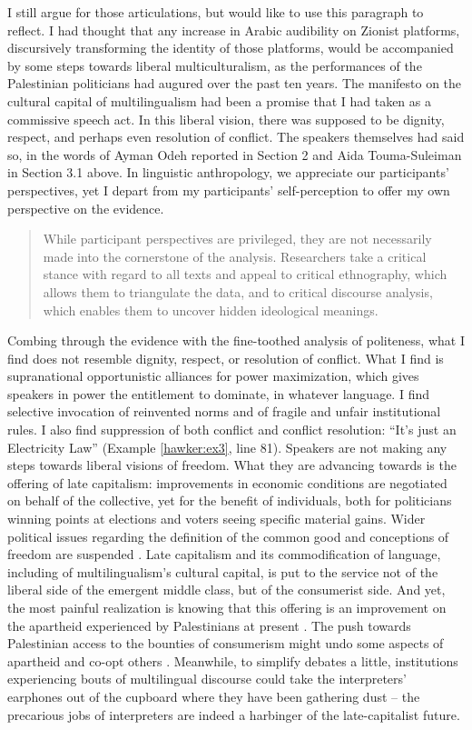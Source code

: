 \documentclass[output=paper,arabicfont]{langscibook}
\begin{document}
I still argue for those articulations, but would like to use this paragraph to reflect. I had thought that any increase in Arabic audibility on Zionist platforms, discursively transforming the identity of those platforms, would be accompanied by some steps towards liberal multiculturalism, as the performances of the Palestinian politicians had augured over the past ten years. The manifesto on the cultural capital of multilingualism had been a promise that I had taken as a commissive speech act. In this liberal vision, there was supposed to be dignity, respect, and perhaps even resolution of conflict. The speakers themselves had said so, in the words of Ayman Odeh reported in Section 2 and Aida Touma-Suleiman in Section 3.1 above. In linguistic anthropology, we appreciate our participants’ perspectives, yet I depart from my participants’ self-perception to offer my own perspective on the evidence. 

\begin{quote}
While participant perspectives are privileged, they are not necessarily made into the cornerstone of the analysis. Researchers take a critical stance with regard to all texts and appeal to critical ethnography, which allows them to triangulate the data, and to critical discourse analysis, which enables them to uncover hidden ideological meanings.  \citep[25]{multilingual2004a}
\end{quote}

Combing through the evidence with the fine-toothed analysis of politeness, what I find does not resemble dignity, respect, or resolution of conflict. What I find is supranational opportunistic alliances for power maximization, which gives speakers in power the entitlement to dominate, in whatever language. I find selective invocation of reinvented norms and of fragile and unfair institutional rules. I also find suppression of both conflict and conflict resolution: “It’s just an Electricity Law” (Example \ref{hawker:ex3}, line 81). Speakers are not making any steps towards liberal visions of freedom. What they are advancing towards is the offering of late capitalism: improvements in economic conditions are negotiated on behalf of the collective, yet for the benefit of individuals, both for politicians winning points at elections and voters seeing specific material gains. Wider political issues regarding the definition of the common good and conceptions of freedom are suspended \citep{davis2008a}. Late capitalism and its commodification of language, including of multilingualism’s cultural capital, is put to the service not of the liberal side of the emergent middle class, but of the consumerist side. And yet, the most painful realization is knowing that this offering is an improvement on the apartheid experienced by Palestinians at present  \citep{international2022a}. The push towards Palestinian access to the bounties of consumerism might undo some aspects of apartheid and co-opt others \citep{taha2020a}. Meanwhile, to simplify debates a little, institutions experiencing bouts of multilingual discourse could take the interpreters’ earphones out of the cupboard where they have been gathering dust – the precarious jobs of interpreters are indeed a harbinger of the late-capitalist future.
\end{document}
